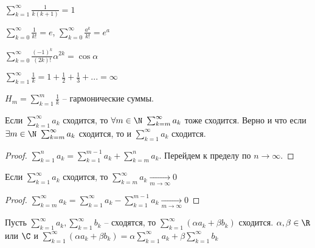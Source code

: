 \begin{Example}
	$\sum_{k=1}^{\infty} \frac{1}{k(k + 1)} = 1$ 
\end{Example}

\begin{Example}
	$\sum_{k=0}^{\infty} \frac{1}{k!} = e$, $\sum_{k=0}^{\infty} \frac{a^k}{k!} = e^a$ 
\end{Example}

\begin{Example}
	$\sum_{k=0}^{\infty} \frac{(-1)^k}{(2k)!}\alpha^{2k} = \cos \alpha$ 
\end{Example}

\begin{Example}
	$\sum_{k=1}^{\infty} \frac{1}{k} = 1 + \frac{1}{2} + \frac{1}{3} + ... = \infty$ 
\end{Example}

\begin{Rem}
	$H_m = \sum_{k=1}^{m} \frac{1}{k}$ -- гармонические суммы. 
\end{Rem}

\begin{Property}
	Если $\sum_{k=1}^{\infty} a_k$ сходится, то $\forall m \in \N \ \sum_{k=m}^{\infty} a_k$ тоже сходится.
		Верно и что если $\exists m \in \N \ \sum_{k=m}^{\infty} a_k$ сходится, то и $\sum_{k=1}^{\infty} a_k$ сходится.
\end{Property}

\begin{proof}
	$\sum_{k=1}^{n} a_k = \sum_{k=1}^{m - 1} a_k + \sum_{k=m}^{n} a_k$. Перейдем к пределу по $n \to \infty$. 
\end{proof}

\begin{Property}
	Если $\sum_{k=1}^{\infty} a_k$ сходится, то $\sum_{k=m}^{\infty} a_k \xrightarrow[m \to \infty]{} 0$  
\end{Property}

\begin{proof}
	$\sum_{k=m}^{\infty} a_k = \sum_{k=1}^{\infty} a_k - \sum_{k=1}^{m - 1} a_k \xrightarrow[m \to \infty]{}0$ 
\end{proof}

\begin{Property}
	Пусть $\sum_{k=1}^{\infty} a_k, \sum_{k=1}^{\infty} b_k$ -- сходятся, то $\sum_{k=1}^{\infty} (\alpha a_k + \beta b_k)$ сходится.  
		$\alpha, \beta \in \R$ или $\C$ и $\sum_{k=1}^{\infty} (\alpha a_k + \beta b_k) = \alpha \sum_{k=1}^{\infty} a_k + \beta \sum_{k=1}^{\infty} b_k$ 
\end{Property}


